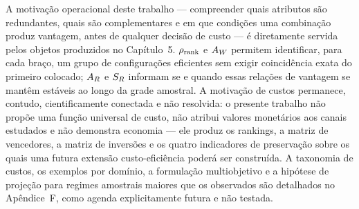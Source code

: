 A motivação operacional deste trabalho --- compreender quais atributos são redundantes, quais são complementares e em que condições uma combinação produz vantagem, antes de qualquer decisão de custo --- é diretamente servida pelos objetos produzidos no Capítulo~5. $\rho_{\mathrm{rank}}$ e $A_W$ permitem identificar, para cada braço, um grupo de configurações eficientes sem exigir coincidência exata do primeiro colocado; $A_R$ e $S_R$ informam se e quando essas relações de vantagem se mantêm estáveis ao longo da grade amostral. A motivação de custos permanece, contudo, cientificamente conectada e não resolvida: o presente trabalho não propõe uma função universal de custo, não atribui valores monetários aos canais estudados e não demonstra economia --- ele produz os rankings, a matriz de vencedores, a matriz de inversões e os quatro indicadores de preservação sobre os quais uma futura extensão custo-eficiência poderá ser construída. A taxonomia de custos, os exemplos por domínio, a formulação multiobjetivo e a hipótese de projeção para regimes amostrais maiores que os observados são detalhados no Apêndice~F, como agenda explicitamente futura e não testada.
